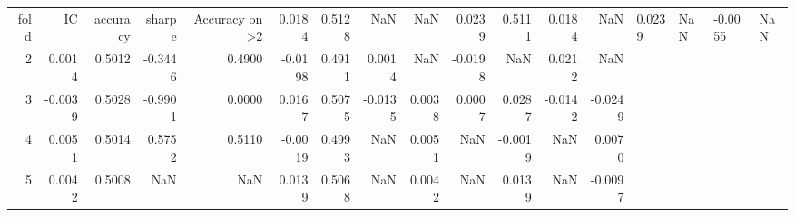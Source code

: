 \begin{tabular}{rrrrrrrrrrrrr}
\toprule
fold & IC & accuracy & sharpe & Accuracy on >2%
 & 0.0184 & 0.5128 & NaN & NaN & 0.0239 & 0.5111 & 0.0184 & NaN & 0.0239 & NaN & -0.0055 & NaN \\
2 & 0.0014 & 0.5012 & -0.3446 & 0.4900 & -0.0198 & 0.4911 & 0.0014 & NaN & -0.0198 & NaN & 0.0212 & NaN \\
3 & -0.0039 & 0.5028 & -0.9901 & 0.0000 & 0.0167 & 0.5075 & -0.0135 & 0.0038 & 0.0007 & 0.0287 & -0.0142 & -0.0249 \\
4 & 0.0051 & 0.5014 & 0.5752 & 0.5110 & -0.0019 & 0.4993 & NaN & 0.0051 & NaN & -0.0019 & NaN & 0.0070 \\
5 & 0.0042 & 0.5008 & NaN & NaN & 0.0139 & 0.5068 & NaN & 0.0042 & NaN & 0.0139 & NaN & -0.0097 \\
\bottomrule
\end{tabular}
